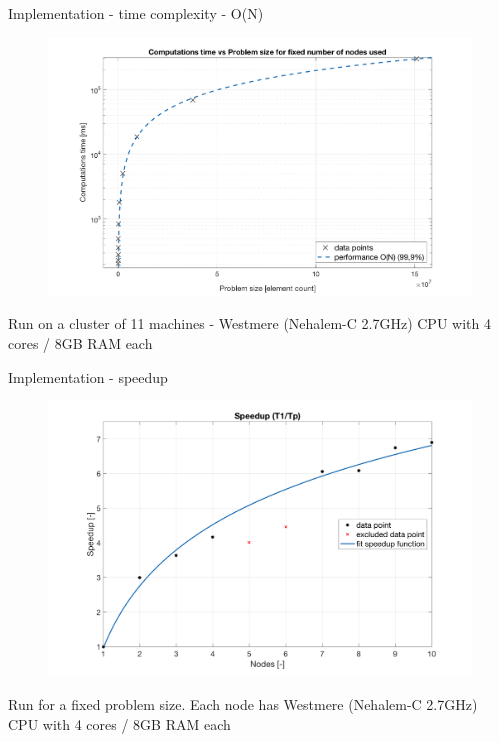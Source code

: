 \documentclass[c]{beamer}
\begin{document}
\begin{frame}{Implementation - time complexity - O(N)}

\begin{figure}
      \centering
      \includegraphics[width=1\textwidth]{img/TimeVsProblemSizeFixedNodes.png}
    \end{figure}
    
    {\tiny * Run on a cluster of 11 machines - Westmere (Nehalem-C 2.7GHz) CPU with 4 cores / 8GB RAM each}

\end{frame}


\begin{frame}{Implementation - speedup}

\begin{figure}
      \centering
      \includegraphics[width=1\textwidth]{img/speedup2.png}
    \end{figure}
    
    {\tiny * Run for a fixed problem size. Each node has Westmere (Nehalem-C 2.7GHz) CPU with 4 cores / 8GB RAM each}

\end{frame}
\end{document}
